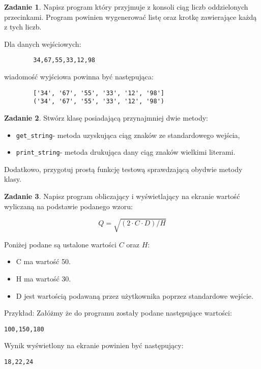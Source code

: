 \documentclass[11pt]{article}
\theoremstyle{definition}
\newtheorem{zadanie}{Zadanie}
\begin{document}
\begin{zadanie}
	Napisz program który przyjmuje z konsoli ciąg liczb oddzielonych przecinkami. Program powinien wygenerować listę oraz krotkę zawierające każdą z tych liczb.
	
	\bigskip
	Dla danych wejściowych:
	
	\begin{verbatim}
		34,67,55,33,12,98
	\end{verbatim}
	
	wiadomość wyjściowa powinna być następująca:
	
	\begin{verbatim}
		['34', '67', '55', '33', '12', '98']
		('34', '67', '55', '33', '12', '98')
	\end{verbatim}
\end{zadanie}

\begin{zadanie}
Stwórz klasę posiadającą przynajmniej dwie metody:
\begin{itemize}
	\item\texttt{get\_string}- metoda uzyskująca ciąg znaków ze standardowego wejścia,
	\item\texttt{print\_string}- metoda drukująca dany ciąg znaków wielkimi literami.
\end{itemize}
Dodatkowo, przygotuj prostą funkcję testową sprawdzającą obydwie metody klasy.
\end{zadanie}

\begin{zadanie}
Napisz program obliczający i wyświetlający na ekranie wartość wyliczaną na podstawie podanego wzoru:

$$Q = \sqrt{(2 \cdot C \cdot D)/H}$$

Poniżej podane są ustalone wartości $C$ oraz $H$:

\begin{itemize}
	\item C ma wartość 50.
	\item H ma wartość 30.
	\item D jest wartością podawaną przez użytkownika poprzez standardowe wejście.
\end{itemize}

Przykład: Załóżmy że do programu zostały podane następujące wartości:
\begin{verbatim}
100,150,180
\end{verbatim}

Wynik wyświetlony na ekranie powinien być następujący:
\begin{verbatim}
18,22,24
\end{verbatim}
\end{zadanie}
\end{document}
